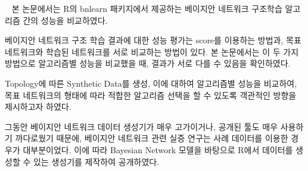 \vspace{1cm} {\small \ \indent
본 논문에서는 R의 bnlearn 패키지에서 제공하는 베이지안 네트워크 구조학습 알고리즘 간의 성능을 비교하였다.

베이지안 네트워크 구조 학습 결과에 대한 성능 평가는 score를 이용하는 방법과, 목표 네트워크와 학습된 네트워크를 서로 비교하는 방법이 있다. 본 논문에서는 이 두 가지 방법으로 알고리즘별 성능을 비교했을 때, 결과가 서로 다를 수 있음을 확인하였다.

Topology에 따른 Synthetic Data를 생성, 이에 대하여 알고리즘별 성능을 비교하여, 목표 네트워크의 형태에 따라 적합한 알고리즘 선택을 할 수 있도록 객관적인 방향을 제시하고자 하였다.

그동안 베이지안 네트워크 데이터 생성기가 매우 고가이거나, 공개된 툴도 매우 사용하기 까다로웠기 때문에, 베이지안 네트워크 관련 실증 연구는 사례 데이터를 이용한 경우가 대부분이었다. 이에 따라 Bayesian Network 모델을 바탕으로 R에서 데이터를 생성할 수 있는 생성기를 제작하여 공개하였다.
}